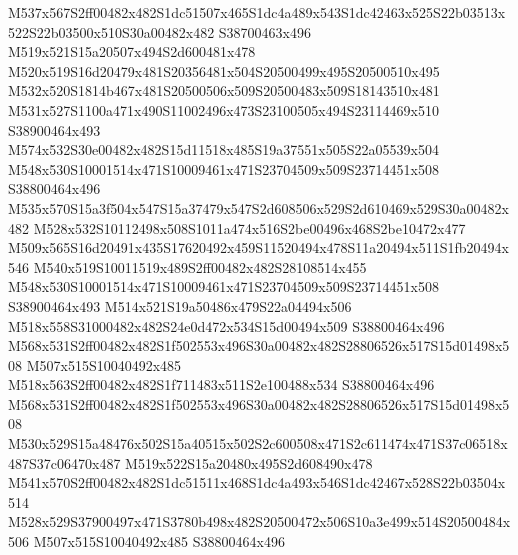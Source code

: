 \documentclass{article}
\begin{document}
\begin{multicols}{2}

M537x567S2ff00482x482S1dc51507x465S1dc4a489x543S1dc42463x525S22b03513x522S22b03500x510S30a00482x482 S38700463x496 M519x521S15a20507x494S2d600481x478 M520x519S16d20479x481S20356481x504S20500499x495S20500510x495 M532x520S1814b467x481S20500506x509S20500483x509S18143510x481 M531x527S1100a471x490S11002496x473S23100505x494S23114469x510 S38900464x493 M574x532S30e00482x482S15d11518x485S19a37551x505S22a05539x504 M548x530S10001514x471S10009461x471S23704509x509S23714451x508 S38800464x496 M535x570S15a3f504x547S15a37479x547S2d608506x529S2d610469x529S30a00482x482 M528x532S10112498x508S1011a474x516S2be00496x468S2be10472x477 M509x565S16d20491x435S17620492x459S11520494x478S11a20494x511S1fb20494x546 M540x519S10011519x489S2ff00482x482S28108514x455 M548x530S10001514x471S10009461x471S23704509x509S23714451x508 S38900464x493 M514x521S19a50486x479S22a04494x506 M518x558S31000482x482S24e0d472x534S15d00494x509 S38800464x496 M568x531S2ff00482x482S1f502553x496S30a00482x482S28806526x517S15d01498x508 M507x515S10040492x485 M518x563S2ff00482x482S1f711483x511S2e100488x534 S38800464x496 M568x531S2ff00482x482S1f502553x496S30a00482x482S28806526x517S15d01498x508 M530x529S15a48476x502S15a40515x502S2c600508x471S2c611474x471S37c06518x487S37c06470x487 M519x522S15a20480x495S2d608490x478 M541x570S2ff00482x482S1dc51511x468S1dc4a493x546S1dc42467x528S22b03504x514 M528x529S37900497x471S3780b498x482S20500472x506S10a3e499x514S20500484x506 M507x515S10040492x485 S38800464x496






\end{multicols}
\end{document}

